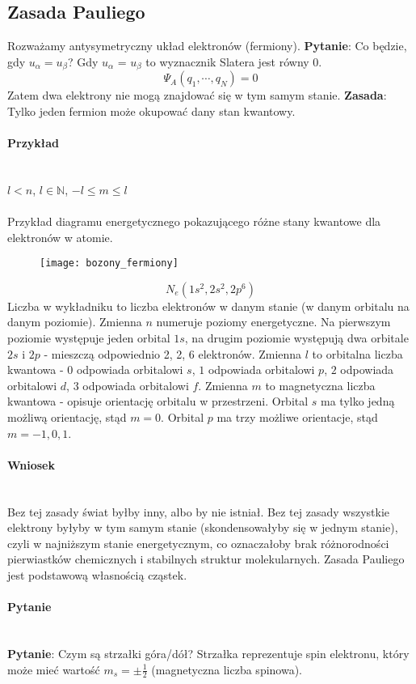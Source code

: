 \subsection{Zasada Pauliego}
%
Rozważamy antysymetryczny układ elektronów (fermiony). \textbf{Pytanie}: Co będzie, gdy $u_\alpha = u_\beta$?
%
Gdy $u_\alpha$ = $u_\beta$ to wyznacznik Slatera jest równy 0.
%
\begin{equation*}
    \Psi_A (q_1, \cdots, q_N) = 0
\end{equation*}
%
Zatem dwa elektrony nie mogą znajdować się w tym samym stanie.
%
\textbf{Zasada}: Tylko jeden fermion może okupować dany stan kwantowy.
%
\paragraph*{Przykład}\mbox{}\\
%
$l < n$, $l \in \mathbb{N}$, $-l \leq m \leq l$
%
\\ \\
%
Przykład diagramu energetycznego pokazującego różne stany kwantowe dla elektronów w atomie.
\begin{figure}[H]
    \centering
    \texttt{[image: bozony\_fermiony]}
    \label{fig:bozony_fermiony}
\end{figure}
%
\begin{equation*}
    N_e(1s^2, 2s^2, 2p^6)
\end{equation*}
%
Liczba w wykładniku to liczba elektronów w danym stanie (w danym orbitalu na danym poziomie). Zmienna $n$ numeruje poziomy energetyczne. Na pierwszym
poziomie występuje jeden orbital $1s$, na drugim poziomie występują dwa orbitale $2s$ i $2p$ - mieszczą odpowiednio 2, 2, 6 elektronów. Zmienna $l$ to
orbitalna liczba kwantowa - $0$ odpowiada orbitalowi $s$, $1$ odpowiada orbitalowi $p$, $2$ odpowiada orbitalowi $d$, $3$ odpowiada orbitalowi $f$.
Zmienna $m$ to magnetyczna liczba kwantowa - opisuje orientację orbitalu w przestrzeni. Orbital $s$ ma tylko jedną możliwą orientację,
stąd $m = 0$. Orbital $p$ ma trzy możliwe orientacje, stąd $m = -1, 0, 1$.
\paragraph*{Wniosek}\mbox{}\\
%
Bez tej zasady świat byłby inny, albo by nie istniał. Bez tej zasady wszystkie elektrony byłyby w tym samym stanie (skondensowałyby się w jednym stanie),
czyli w najniższym stanie energetycznym, co oznaczałoby brak różnorodności pierwiastków chemicznych i stabilnych struktur molekularnych.
%
Zasada Pauliego jest podstawową własnością cząstek.
%
\paragraph*{Pytanie}\mbox{}\\
%
\textbf{Pytanie}: Czym są strzałki góra/dół? Strzałka reprezentuje spin elektronu, który może mieć wartość $m_s = \pm \frac{1}{2}$ (magnetyczna liczba spinowa).
